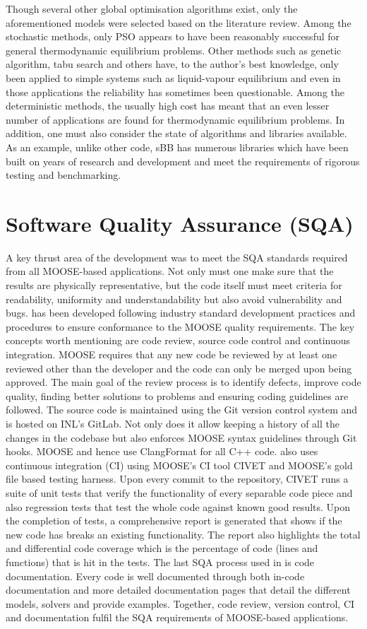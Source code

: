 Though several other global optimisation algorithms exist, only the aforementioned models were selected based on the literature review. Among the stochastic methods, only PSO appears to have been reasonably successful for general thermodynamic equilibrium problems. Other methods such as genetic algorithm, tabu search and others have, to the author's best knowledge, only been applied to simple systems such as liquid-vapour equilibrium and even in those applications the reliability has sometimes been questionable. Among the deterministic methods, the usually high cost has meant that an even lesser number of applications are found for thermodynamic equilibrium problems. In addition, one must also consider the state of algorithms and libraries available. As an example, unlike other code, sBB has numerous libraries which have been built on years of research and development and meet the requirements of rigorous testing and benchmarking. 


\section{Software Quality Assurance (SQA)}
	A key thrust area of the {\GEM} development was to meet the SQA standards required from all MOOSE-based applications. Not only must one make sure that the results are physically representative, but the code itself must meet criteria for readability, uniformity and understandability but also avoid vulnerability and bugs.
{\GEM} has been developed following industry standard  development practices and procedures to ensure conformance to the MOOSE quality requirements. The key concepts worth mentioning are code review, source code control and continuous integration. MOOSE requires that any new code be reviewed by at least one reviewed other than the developer and the code can only be merged upon being approved. The main goal of the review process is to identify defects, improve code quality, finding better solutions to problems and ensuring coding guidelines are followed. The source code is maintained using the Git version control system and is hosted on INL's GitLab. Not only does it allow keeping a history of all the changes in the codebase but also enforces MOOSE syntax guidelines through Git hooks. MOOSE and hence {\GEM} use ClangFormat for all C++ code. {\GEM} also uses continuous integration (CI) using MOOSE's CI tool CIVET \cite{Slaughter:2021aa} and MOOSE's gold file based testing harness. Upon every commit to the repository, CIVET runs a suite of unit tests that verify the functionality of every separable code piece and also regression tests that test the whole code against known good results. Upon the completion of tests, a comprehensive report is generated that shows if the new code has breaks an existing functionality. The report also highlights the total and differential code coverage which is the percentage of code (lines and functions) that is hit in the tests. The last SQA process used in {\GEM} is code documentation. Every code is well documented through both in-code documentation and more detailed documentation pages that detail the different models, solvers and provide examples. Together, code review, version control, CI and documentation fulfil the SQA requirements of MOOSE-based applications.

